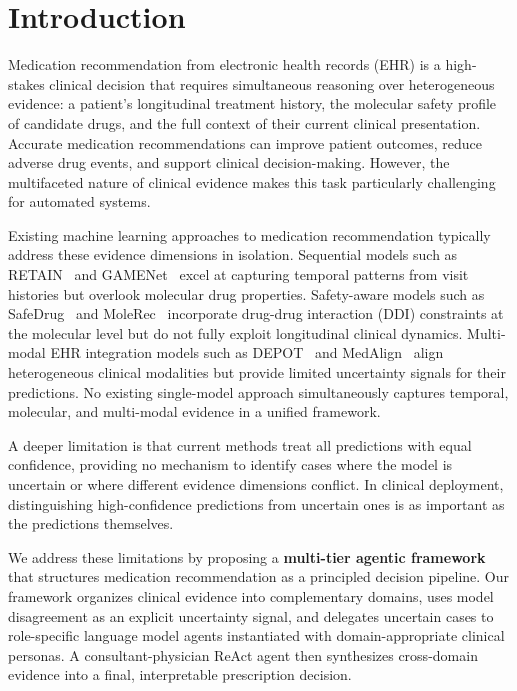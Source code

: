 \documentclass[sigconf,anonymous]{acmart}
\begin{document}
\maketitle

\section{Introduction}

Medication recommendation from electronic health records (EHR) is a high-stakes clinical decision that requires simultaneous reasoning over heterogeneous evidence: a patient's longitudinal treatment history, the molecular safety profile of candidate drugs, and the full context of their current clinical presentation. Accurate medication recommendations can improve patient outcomes, reduce adverse drug events, and support clinical decision-making. However, the multifaceted nature of clinical evidence makes this task particularly challenging for automated systems.

Existing machine learning approaches to medication recommendation typically address these evidence dimensions in isolation. Sequential models such as RETAIN~\cite{retain} and GAMENet~\cite{gamenet} excel at capturing temporal patterns from visit histories but overlook molecular drug properties. Safety-aware models such as SafeDrug~\cite{safedrug} and MoleRec~\cite{molerec} incorporate drug-drug interaction (DDI) constraints at the molecular level but do not fully exploit longitudinal clinical dynamics. Multi-modal EHR integration models such as DEPOT~\cite{depot} and MedAlign~\cite{medalign} align heterogeneous clinical modalities but provide limited uncertainty signals for their predictions. No existing single-model approach simultaneously captures temporal, molecular, and multi-modal evidence in a unified framework.

A deeper limitation is that current methods treat all predictions with equal confidence, providing no mechanism to identify cases where the model is uncertain or where different evidence dimensions conflict. In clinical deployment, distinguishing high-confidence predictions from uncertain ones is as important as the predictions themselves.

We address these limitations by proposing a \textbf{multi-tier agentic framework} that structures medication recommendation as a principled decision pipeline. Our framework organizes clinical evidence into complementary domains, uses model disagreement as an explicit uncertainty signal, and delegates uncertain cases to role-specific language model agents instantiated with domain-appropriate clinical personas. A consultant-physician ReAct agent then synthesizes cross-domain evidence into a final, interpretable prescription decision.
\end{document}
